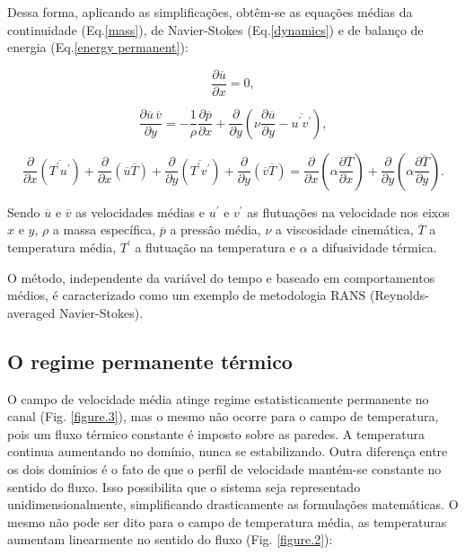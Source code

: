 Dessa forma, aplicando as simplificações, obtêm-se as equações médias da continuidade (Eq.\ref{mass}), de Navier-Stokes (Eq.\ref{dynamics}) e de balanço de energia (Eq.\ref{energy permanent}):

\begin{equation}\label{mass}
\frac{\partial \overline{u}}{\partial x} = 0,
\end{equation}

\begin{equation}\label{dynamics}
\frac{\partial \overline{u} \, \overline{v}}{\partial y} = 
- \frac{1}{\rho} \frac{\partial \overline{p}}{\partial x} + \frac{\partial}{\partial y}\left(\nu \frac{\partial \overline{u}}{\partial y} - \overline{u^\prime v^\prime}\right),
\end{equation}


\begin{equation}\label{energy permanent}
\frac{\partial{}}{\partial{x}} \left(\overline{T^\prime u^\prime}\right) + \frac{\partial{}}{\partial{x}}\left(\overline{u} \overline{T}\right)     + 
\frac{\partial{}}{\partial{y}} \left(\overline{T^\prime v^\prime}\right) + \frac{\partial{}}{\partial{y}}\left(\overline{v} \overline{T}\right) 
=
{\frac{\partial{}}{\partial{x}}} \left(\alpha {\frac{\partial{\overline{T}}}{\partial{x}}} \right) +
{\frac{\partial{}}{\partial{y}}} \left(\alpha {\frac{\partial{\overline{T}}}{\partial{y}}} \right). 
\end{equation}

Sendo $\overline{u}$ e $\overline{v}$ as velocidades médias e $u^\prime$ e $v^\prime$ as flutuações na velocidade nos eixos $x$ e $y$, $\rho$ a massa específica, $\overline{p}$ a pressão média, $\nu$ a viscosidade cinemática, $\overline{T}$ a temperatura média, $T^\prime$ a flutuação na temperatura e $\alpha$ a difusividade térmica.

O método, independente da variável do tempo e baseado em comportamentos médios, é caracterizado como um exemplo de metodologia RANS (Reynolds-averaged Navier-Stokes).


\subsection{O regime permanente térmico}

O campo de velocidade média atinge regime estatisticamente permanente no canal (Fig. \ref{figure.3}), mas o mesmo não ocorre para o campo de temperatura, pois um fluxo térmico constante é imposto sobre as paredes. A temperatura continua aumentando no domínio, nunca se estabilizando.
Outra diferença entre os dois domínios é o fato de que o perfil de velocidade mantém-se constante no sentido do fluxo. Isso possibilita que o sistema seja representado unidimensionalmente, simplificando drasticamente as formulações matemáticas. O mesmo não pode ser dito para o campo de temperatura média, as temperaturas aumentam linearmente no sentido do fluxo (Fig. \ref{figure.2}):

